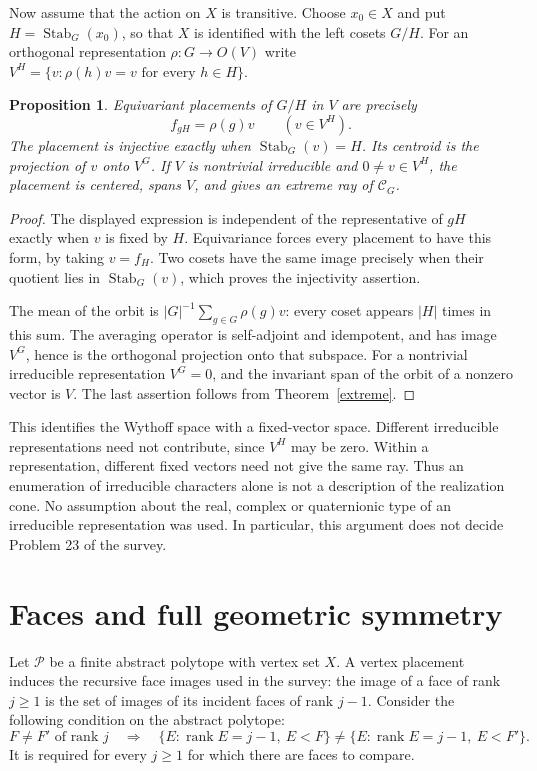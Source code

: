 \documentclass[11pt,a4paper]{article}
\newtheorem{proposition}[theorem]{Proposition}
\newcommand{\Stab}{\operatorname{Stab}}
\begin{document}
Now assume that the action on $X$ is transitive. Choose $x_0\in X$ and
put $H=\Stab_G(x_0)$, so that $X$ is identified with the left cosets
$G/H$. For an orthogonal representation $\rho:G\to O(V)$ write
$V^H=\{v:\rho(h)v=v\text{ for every }h\in H\}$.

\begin{proposition}\label{wythoff}
Equivariant placements of $G/H$ in $V$ are precisely
\[
 f_{gH}=\rho(g)v\qquad(v\in V^H).
\]
The placement is injective exactly when $\Stab_G(v)=H$. Its centroid is
the projection of $v$ onto $V^G$. If $V$ is nontrivial irreducible and
$0\ne v\in V^H$, the placement is centered, spans $V$, and gives an
extreme ray of $\mathcal C_G$.
\end{proposition}
\begin{proof}
The displayed expression is independent of the representative of $gH$
exactly when $v$ is fixed by $H$. Equivariance forces every placement to
have this form, by taking $v=f_{H}$. Two cosets have the same image
precisely when their quotient lies in $\Stab_G(v)$, which proves the
injectivity assertion.

The mean of the orbit is $|G|^{-1}\sum_{g\in G}\rho(g)v$: every coset
appears $|H|$ times in this sum. The averaging operator is self-adjoint
and idempotent, and has image $V^G$, hence is the orthogonal projection
onto that subspace. For a nontrivial irreducible representation $V^G=0$,
and the invariant span of the orbit of a nonzero vector is $V$. The
last assertion follows from Theorem~\ref{extreme}.
\end{proof}

This identifies the Wythoff space with a fixed-vector space. Different
irreducible representations need not contribute, since $V^H$ may be zero.
Within a representation, different fixed vectors need not give the same
ray. Thus an enumeration of irreducible characters alone is not a
description of the realization cone. No assumption about the real,
complex or quaternionic type of an irreducible representation was used.
In particular, this argument does not decide Problem 23 of the survey.

\section{Faces and full geometric symmetry}
Let $\mathcal P$ be a finite abstract polytope with vertex set $X$.
A vertex placement induces the recursive face images used in the survey:
the image of a face of rank $j\geq1$ is the set of images of its incident
faces of rank $j-1$. Consider the following condition on the abstract
polytope:
\begin{equation}\label{faces}
 F\ne F'\text{ of rank }j\quad\Longrightarrow\quad
 \{E:\operatorname{rank}E=j-1,\ E<F\}
 \ne\{E:\operatorname{rank}E=j-1,\ E<F'\}.
\end{equation}
It is required for every $j\geq1$ for which there are faces to compare.
\end{document}
